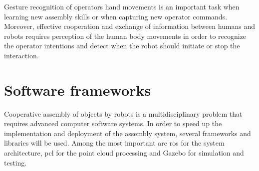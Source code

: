 Gesture recognition of operators hand movements \cite{Oikonomidis2012,Gleeson2013} is an important task when learning new assembly skills or when capturing new operator commands. Moreover, effective cooperation and exchange of information between humans and robots \cite{Putz2014} requires perception of the human body movements \cite{Roitberg2014} in order to recognize the operator intentions and detect when the robot should initiate or stop the interaction.


%



\section{Software frameworks}

Cooperative assembly of objects by robots is a multidisciplinary problem that requires advanced computer software systems. In order to speed up the implementation and deployment of the assembly system, several frameworks and libraries will be used. Among the most important are \gls{ros} for the system architecture, \gls{pcl} for the point cloud processing and Gazebo for simulation and testing.

